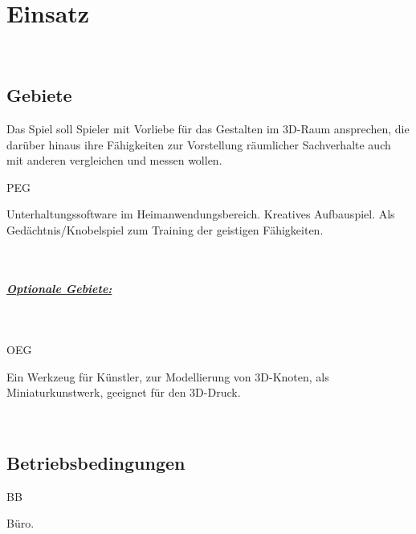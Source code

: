 %
%


\chapter{Einsatz}
\label{ES}~\\


\section{Gebiete}
\label{ES:Gebiete}

Das Spiel soll Spieler mit Vorliebe für das Gestalten im 3D-Raum ansprechen, die darüber hinaus ihre Fähigkeiten zur Vorstellung räumlicher Sachverhalte auch mit anderen vergleichen und messen wollen.\\



\begin{ids}{\gls{PEG}}

	\id[10] Unterhaltungssoftware im Heimanwendungsbereich.
	\id[20] Kreatives Aufbauspiel.
	\id[30] Als Gedächtnis/Knobelspiel zum Training der geistigen Fähigkeiten.

\end{ids}

~\\


\paragraph*{\underline{Optionale Gebiete:}}~\\

\begin{ids}{\gls{OEG}}

	\id[10] Ein Werkzeug für Künstler, zur Modellierung von 3D-Knoten, als Miniaturkunstwerk, geeignet für den 3D-Druck.

\end{ids}


%
%
~\\

\section{Betriebsbedingungen}
\label{ES:BB}

\begin{ids}{\gls{BB}}

	\id[10] Büro.

\end{ids}


